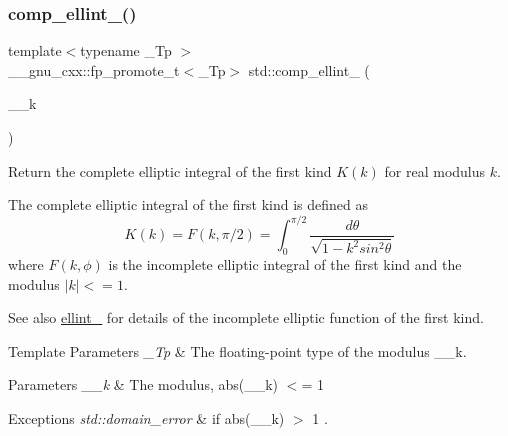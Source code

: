 \mbox{\label{group__cxx17__math__spec__func_gad559217fb01e7a8b7a6e23eeedda64be}} 
\subsubsection{\texorpdfstring{comp\+\_\+ellint\+\_()}{comp\_ellint\_1()}}
{\footnotesize\ttfamily template$<$typename \+\_\+\+Tp $>$ \\
\+\_\+\+\_\+gnu\+\_\+cxx\+::fp\+\_\+promote\+\_\+t$<$\+\_\+\+Tp$>$ std\+::comp\+\_\+ellint\+\_ (\begin{DoxyParamCaption}\item[{\+\_\+\+Tp}]{\+\_\+\+\_\+k }\end{DoxyParamCaption})\hspace{0.3cm}{\ttfamily [inline]}}

Return the complete elliptic integral of the first kind $ K(k) $ for real modulus $ k $.

The complete elliptic integral of the first kind is defined as \[ K(k) = F(k,\pi/2) = \int_0^{\pi/2}\frac{d\theta} {\sqrt{1 - k^2 sin^2\theta}} \] where $ F(k,\phi) $ is the incomplete elliptic integral of the first kind and the modulus $ |k| <= 1 $. \begin{DoxySeeAlso}{See also}
\hyperlink{group__cxx17__math__spec__func_ga1550d6947bbbeee9865aabd398102a36}{ellint\+\_} for details of the incomplete elliptic function of the first kind.
\end{DoxySeeAlso}

\begin{DoxyTemplParams}{Template Parameters}
{\em \+\_\+\+Tp} & The floating-\/point type of the modulus {\ttfamily \+\_\+\+\_\+k}. \\
\hline
\end{DoxyTemplParams}

\begin{DoxyParams}{Parameters}
{\em \+\_\+\+\_\+k} & The modulus, {\ttfamily  abs(\+\_\+\+\_\+k) $<$= 1 } \\
\hline
\end{DoxyParams}

\begin{DoxyExceptions}{Exceptions}
{\em std\+::domain\+\_\+error} & if {\ttfamily  abs(\+\_\+\+\_\+k) $>$ 1 }. \\
\hline
\end{DoxyExceptions}


